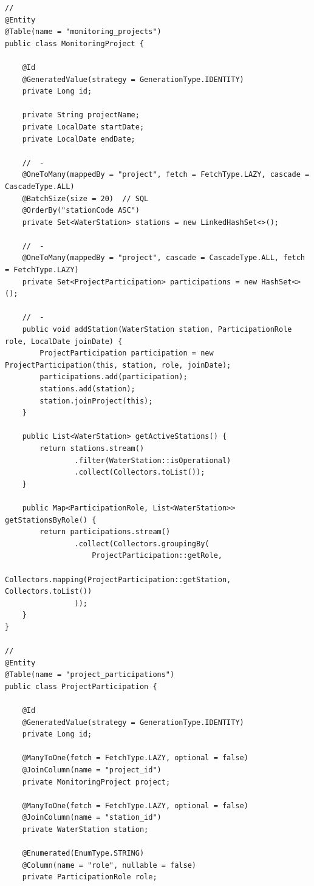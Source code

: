 \begin{lstlisting}[style=java]
// 
@Entity
@Table(name = "monitoring_projects")
public class MonitoringProject {
    
    @Id
    @GeneratedValue(strategy = GenerationType.IDENTITY)
    private Long id;
    
    private String projectName;
    private LocalDate startDate;
    private LocalDate endDate;
    
    //  - 
    @OneToMany(mappedBy = "project", fetch = FetchType.LAZY, cascade = CascadeType.ALL)
    @BatchSize(size = 20)  // SQL
    @OrderBy("stationCode ASC")
    private Set<WaterStation> stations = new LinkedHashSet<>();
    
    //  - 
    @OneToMany(mappedBy = "project", cascade = CascadeType.ALL, fetch = FetchType.LAZY)
    private Set<ProjectParticipation> participations = new HashSet<>();
    
    //  - 
    public void addStation(WaterStation station, ParticipationRole role, LocalDate joinDate) {
        ProjectParticipation participation = new ProjectParticipation(this, station, role, joinDate);
        participations.add(participation);
        stations.add(station);
        station.joinProject(this);
    }
    
    public List<WaterStation> getActiveStations() {
        return stations.stream()
                .filter(WaterStation::isOperational)
                .collect(Collectors.toList());
    }
    
    public Map<ParticipationRole, List<WaterStation>> getStationsByRole() {
        return participations.stream()
                .collect(Collectors.groupingBy(
                    ProjectParticipation::getRole,
                    Collectors.mapping(ProjectParticipation::getStation, Collectors.toList())
                ));
    }
}

// 
@Entity
@Table(name = "project_participations")
public class ProjectParticipation {
    
    @Id
    @GeneratedValue(strategy = GenerationType.IDENTITY)
    private Long id;
    
    @ManyToOne(fetch = FetchType.LAZY, optional = false)
    @JoinColumn(name = "project_id")
    private MonitoringProject project;
    
    @ManyToOne(fetch = FetchType.LAZY, optional = false)  
    @JoinColumn(name = "station_id")
    private WaterStation station;
    
    @Enumerated(EnumType.STRING)
    @Column(name = "role", nullable = false)
    private ParticipationRole role;
    

\end{lstlisting}
